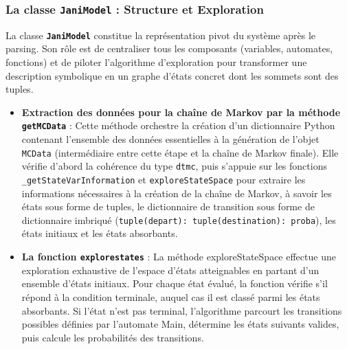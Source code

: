 \documentclass[14pt, a4paper]{extarticle}
\begin{document}
\subsubsection{La classe \texttt{JaniModel} : Structure et Exploration}
La classe \textbf{\texttt{JaniModel}} constitue la représentation pivot du système après le parsing. Son rôle est de centraliser tous les composants (variables, automates, fonctions) et de piloter l'algorithme d'exploration pour transformer une description symbolique en un graphe d'états concret dont les sommets sont des tuples.

\begin{itemize}
\item \textbf{Extraction des données pour la chaîne de Markov par la méthode \texttt{getMCData}} : Cette méthode orchestre la création d'un dictionnaire Python contenant l'ensemble des données essentielles à la génération de l'objet \texttt{MCData} (intermédiaire entre cette étape et la chaîne de Markov finale). Elle vérifie d'abord la cohérence du type \texttt{dtmc}, puis s'appuie sur les fonctions \texttt{\_getStateVarInformation} et \texttt{exploreStateSpace} pour extraire les informations nécessaires à la création de la chaîne de Markov, à savoir les états sous forme de tuples, le dictionnaire de transition sous forme de dictionnaire imbriqué (\texttt{tuple(depart): tuple(destination): proba}), les états initiaux et les états absorbants.

\item \textbf{La fonction \texttt{explorestates}} : La méthode exploreStateSpace effectue une exploration exhaustive de l'espace d'états atteignables en partant d'un ensemble d'états initiaux. Pour chaque état évalué, la fonction vérifie s'il répond à la condition terminale, auquel cas il est classé parmi les états absorbants. Si l'état n'est pas terminal, l'algorithme parcourt les transitions possibles définies par l'automate Main, détermine les états suivants valides, puis calcule les probabilités des transitions.   


\end{itemize}
\end{document}
